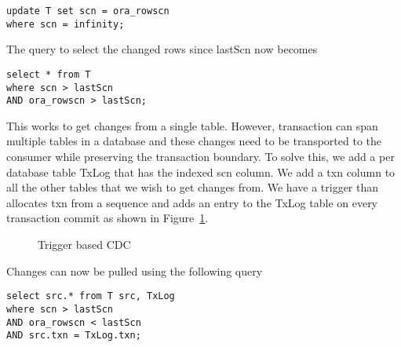 \begin{verbatim}
update T set scn = ora_rowscn
where scn = infinity;
\end{verbatim}

The query to select the changed rows since lastScn now becomes

\begin{verbatim}
select * from T 
where scn > lastScn 
AND ora_rowscn > lastScn;
\end{verbatim}

This works to get changes from a single table. However, transaction can span multiple tables in a database and these changes need to be transported to the consumer while preserving the transaction boundary. To solve this, we add a per database table TxLog that has the indexed scn column. We add a txn column to all the other tables that we wish to get changes from. We have a trigger than allocates txn from a sequence and adds an entry to the TxLog table on every transaction commit as shown in Figure~\ref{fig:txlog}. 

\begin{figure}
\centering
{}
\vspace*{-2ex}
\caption{Trigger based CDC}
\label{fig:txlog}
\vspace*{-2ex}
\end{figure}

Changes can now be pulled using the following query

\begin{verbatim}
select src.* from T src, TxLog 
where scn > lastScn 
AND ora_rowscn < lastScn 
AND src.txn = TxLog.txn;
\end{verbatim}
